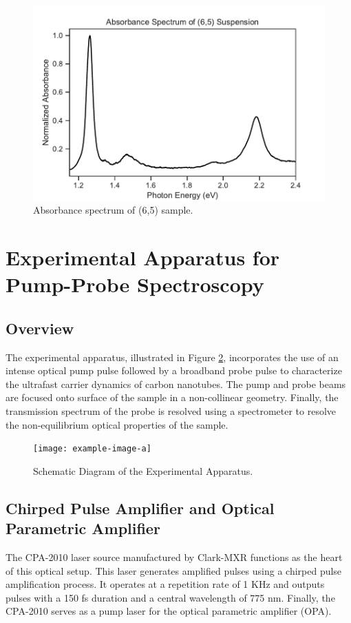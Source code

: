 \begin{figure}[H]
	\centering
	\includegraphics[scale=0.7]{images/chapter_methods/sample_absorbance}
	\caption{ Absorbance spectrum of (6,5) sample.}
	\label{fig:sample_absorbance}
\end{figure}

\section{Experimental Apparatus for Pump-Probe Spectroscopy}

\subsection{Overview}
The experimental apparatus, illustrated in Figure \ref{fig:setup_schematic}, incorporates the use of an intense optical pump pulse followed by a broadband probe pulse to characterize the ultrafast carrier dynamics of carbon nanotubes. The pump and probe beams are focused onto surface of the sample in a non-collinear geometry. Finally, the transmission spectrum of the probe is resolved using a spectrometer to resolve the non-equilibrium optical properties of the sample.  


\begin{figure}[h]
	\centering
	\texttt{[image: example-image-a]}
	\caption{ Schematic Diagram of the Experimental Apparatus. }
	\label{fig:setup_schematic}
\end{figure}


\subsection{Chirped Pulse Amplifier and Optical Parametric Amplifier}
The CPA-2010 laser source manufactured by Clark-MXR functions as the heart of this optical setup. This laser generates amplified pulses using a chirped pulse amplification process. It operates at a repetition rate of 1 KHz and outputs pulses with a 150 fs duration and a central wavelength of 775 nm. Finally, the CPA-2010 serves as a pump laser for the optical parametric amplifier (OPA). 


